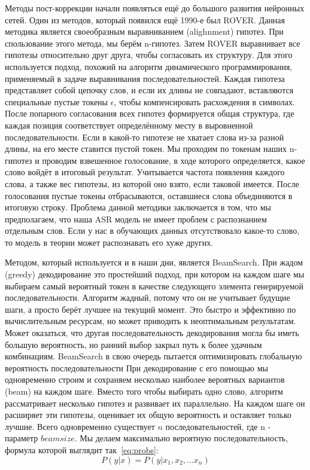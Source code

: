 Методы пост-коррекции начали появляться ещё до большого развития нейронных сетей.
Один из методов, который появился ещё 1990-е был ROVER\cite{fiscus1997post}.
Данная методика является своеобразным выравниванием (alighnment) гипотез.
При спользование этого метода, мы берём n-гипотез. 
Затем ROVER выравнивает все гипотезы относительно друг друга, чтобы согласовать их структуру.
Для этого используется подход, похожий на алгоритм динамического программирования, применяемый в задаче выравнивания последовательностей.
Каждая гипотеза представляет собой цепочку слов, и если их длины не совпадают, вставляются специальные пустые токены $\epsilon$, чтобы компенсировать расхождения в символах.
После попарного согласования всех гипотез формируется общая структура, где каждая позиция соответствует определённому месту в выровненной последовательности.
Если в какой-то гипотезе не хватает слова из-за разной длины, на его месте ставится пустой токен.
Мы проходим по токенам наших n-гипотез и проводим взвешенное голосование, в ходе которого определяется, какое слово войдёт в итоговый результат.
Учитывается частота появления каждого слова, а также вес гипотезы, из которой оно взято, если таковой имеется.
После голосования пустые токены отбрасываются, оставшиеся слова объединяются в итоговую строку.
Проблема данной методики заключается в том, что мы предполагаем, что наша ASR модель не имеет проблем с распознанием отдельным слов.
Если у нас в обучающих данных отсутствовало какое-то слово, то модель в теории может распознавать его хуже других.

Методом, который используется и в наши дни, является BeamSearch\cite{freitag2017beam}.
При жадом (greedy) декодирование это простейший подход, при котором на каждом шаге мы выбираем самый вероятный токен в качестве следующего элемента генерируемой последовательности.
Алгоритм жадный, потому что он не учитывает будущие шаги, а просто берёт лучшее на текущий момент.
Это быстро и эффективно по вычислительным ресурсам, но может приводить к неоптимальным результатам.
Может оказаться, что другая последовательность декодирования могла бы иметь большую вероятность, но ранний выбор закрыл путь к более удачным комбинациям.
BeamSearch в свою очередь пытается оптимизировать глобальную вероятность последовательности
При декодирование с его помощью мы одновременно строим и сохраняем несколько наиболее вероятных вариантов (beam) на каждом шаге.
Вместо того чтобы выбирать одно слово, алгоритм рассматривает несколько гипотез и развивает их параллельно.
На каждом шаге он расширяет эти гипотезы, оценивает их общую вероятность и оставляет только лучшие.
Всего одновременно существует $n$ последовательностей, где n - параметр $beam size$.
Мы делаем максимально вероятную последовательность, формула которой выглядит так~\ref{eq:probs}:
\begin{equation}
  P(y|x) = P(y|x_1,x_2,\dots x_n)
  \label{eq:probs}
\end{equation}

